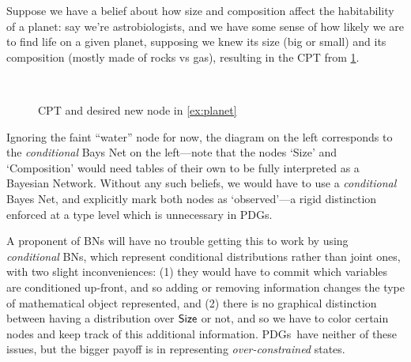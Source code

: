 \documentclass{article}
\newcommand{\MN}{PDG}
\newcommand{\MNs}{\MN s}
\begin{document}
	
	\begin{example} \label{ex:planet}
		Suppose we have a belief about how size and composition affect the habitability of a planet: say we're astrobiologists, and we have some sense of how likely we are to find life on a given planet, supposing we knew its size (big or small) and its composition (mostly made of rocks vs gas), resulting in the CPT from \cref{fig:planet-initial}.
		
		\begin{figure}[h]
			\centering
			~~
			\caption{CPT and desired new node in \cref{ex:planet}}
			\label{fig:planet-initial}
		\end{figure}
		\vspace{1em}
	
		Ignoring the faint ``water'' node for now, the diagram on the left corresponds to the \emph{conditional} Bays Net on the left---note that the nodes `Size' and `Composition' would need tables of their own to be fully interpreted as a Bayesian Network. Without any such beliefs, we would have to use a \emph{conditional} Bayes Net, and explicitly mark both nodes as `observed'---a rigid distinction enforced at a type level which is unnecessary in \MNs.
		
		\begin{vfull}
			A proponent of BNs will have no trouble getting this to work by using \emph{conditional} BNs, which represent conditional distributions rather than joint ones, with two slight inconveniences: (1) they would have to commit which variables are conditioned up-front, and so adding or removing information changes the type of mathematical object represented, and (2) there is no graphical distinction between having a distribution over $\sf Size$ or not, and so we have to color certain nodes and keep track of this additional information. \MNs\ have neither of these issues, but the bigger payoff is in representing \textit{over-constrained} states.
		\end{vfull}


\end{example}
\end{document}
